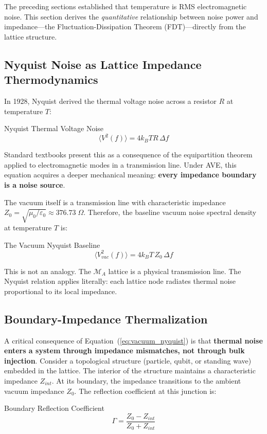 The preceding sections established that temperature is RMS electromagnetic noise. This section derives the \textit{quantitative} relationship between noise power and impedance---the Fluctuation-Dissipation Theorem (FDT)---directly from the lattice structure.

\subsection{Nyquist Noise as Lattice Impedance Thermodynamics}

In 1928, Nyquist derived the thermal voltage noise across a resistor $R$ at temperature $T$:
\begin{resultbox}{Nyquist Thermal Voltage Noise}
\begin{equation}
    \langle V^2(f) \rangle = 4 k_B T R \, \Delta f
    \label{eq:nyquist}
\end{equation}
\end{resultbox}
Standard textbooks present this as a consequence of the equipartition theorem applied to electromagnetic modes in a transmission line. Under AVE, this equation acquires a deeper mechanical meaning: \textbf{every impedance boundary is a noise source}.

The vacuum itself is a transmission line with characteristic impedance $Z_0 = \sqrt{\mu_0 / \varepsilon_0} \approx 376.73 \;\Omega$. Therefore, the baseline vacuum noise spectral density at temperature $T$ is:
\begin{resultbox}{The Vacuum Nyquist Baseline}
\begin{equation}
    \langle V^2_{vac}(f) \rangle = 4 k_B T \, Z_0 \, \Delta f
    \label{eq:vacuum_nyquist}
\end{equation}
\end{resultbox}
This is not an analogy. The $\mathcal{M}_A$ lattice is a physical transmission line. The Nyquist relation applies literally: each lattice node radiates thermal noise proportional to its local impedance.

\subsection{Boundary-Impedance Thermalization}

A critical consequence of Equation~(\ref{eq:vacuum_nyquist}) is that \textbf{thermal noise enters a system through impedance mismatches, not through bulk injection}. Consider a topological structure (particle, qubit, or standing wave) embedded in the lattice. The interior of the structure maintains a characteristic impedance $Z_{int}$. At its boundary, the impedance transitions to the ambient vacuum impedance $Z_0$. The reflection coefficient at this junction is:
\begin{resultbox}{Boundary Reflection Coefficient}
\begin{equation}
    \Gamma = \frac{Z_0 - Z_{int}}{Z_0 + Z_{int}}
    \label{eq:reflection_coefficient}
\end{equation}
\end{resultbox}

